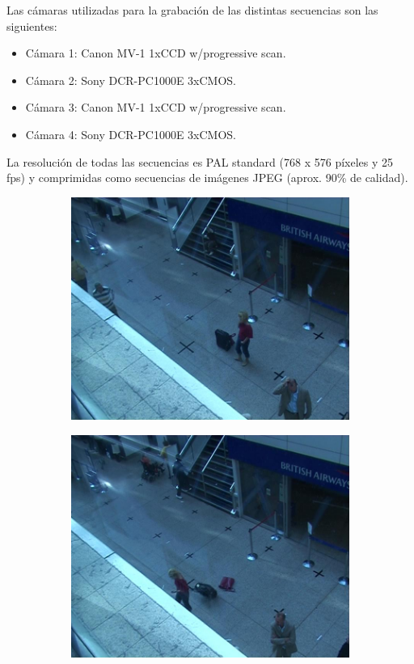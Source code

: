Las cámaras utilizadas para la grabación de las distintas secuencias son las siguientes:

\begin{itemize}
    \item Cámara 1: Canon MV-1 1xCCD w/progressive scan.
    \item Cámara 2: Sony DCR-PC1000E 3xCMOS.
    \item Cámara 3: Canon MV-1 1xCCD w/progressive scan.
    \item Cámara 4: Sony DCR-PC1000E 3xCMOS.
\end{itemize}


La resolución de todas las secuencias es PAL standard (768 x 576 píxeles y 25 \gls{fps}) y comprimidas como secuencias de imágenes JPEG (aprox. 90\% de calidad).

\begin{figure}[ht]
  \centering
  \begin{subfigure}[b]{0.4\textwidth}
    \includegraphics[width=\textwidth]{img/chapters/resultados/datasets/pets2007_3.jpg}
    \caption{}
    \label{fig:pets2007_3}
  \end{subfigure}
  \qquad\qquad
  \begin{subfigure}[b]{0.4\textwidth}
    \includegraphics[width=\textwidth]{img/chapters/resultados/datasets/pets2007_4.jpg}

\end{subfigure}
\end{figure}
